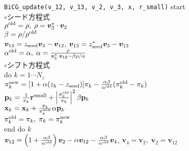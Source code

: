 \documentclass[12pt,titlepage]{jarticle}
\renewenvironment{leftbar}{%
  \def\FrameCommand{\vrule width 1pt \hspace{0pt}}%
  \MakeFramed {\advance\hsize-\width \FrameRestore}}%
 {\endMakeFramed}
\begin{document}
\begin{leftbar}
  \noindent
  \hspace{0.5cm}
  \verb|BiCG_update(v_12, v_13, v_2, v_3, x, r_small)| start
  \\\hspace{1.0cm}
  $\circ$シード方程式
  \\\hspace{1.0cm}
  $\rho^{\rm old} = \rho,\; \rho = {\boldsymbol v}_3^* \cdot {\boldsymbol v}_2$
  \\\hspace{1.0cm}
  $\beta = \rho / \rho^{\rm old}$
  \\\hspace{1.0cm}
  ${\boldsymbol v}_{1 2} = z_{\rm seed} {\boldsymbol v}_2 - {\boldsymbol v}_{1 2}$, 
  ${\boldsymbol v}_{1 3} = z_{\rm seed}^* {\boldsymbol v}_3 - {\boldsymbol v}_{1 3}$
  \\\hspace{1.0cm}
  $\alpha^{\rm old} = \alpha,\; 
  \alpha = \frac{\rho}{{\boldsymbol v}_3^* \cdot {\boldsymbol v}_{1 2} - \beta \rho / \alpha }$
  \\\hspace{1.0cm}
  $\circ$シフト方程式
  \\\hspace{1.0cm}
  do $k = 1 \cdots N_z$
  \\\hspace{1.5cm}
  $\pi_k^{\rm new} = [1+\alpha(z_k-z_{\rm seed})]\pi_k - \frac{\alpha \beta}{\alpha^{\rm old}}(\pi_k^{\rm old} - \pi_k)$
  \\\hspace{1.5cm}
  ${\bf p}_{k} = \frac{1}{\pi_k} {\bf r}^{\rm small} + 
  \left|\frac{\pi^{\rm old}_k}{\pi_k } \right|^2 \beta {\bf p}_{k}$
  \\\hspace{1.5cm}
  ${\bf x}_{k} = {\bf x}_{k} + \frac{\pi_k}{\pi_k^{\rm new}} \alpha {\bf p}_{k}$
  \\\hspace{1.5cm}
  $\pi_k^{\rm old} = \pi_k,\; \pi_k = \pi_k^{\rm new}$
  \\\hspace{1.0cm}
  end do $k$
  \\\hspace{1.0cm}
  ${\boldsymbol v}_{1 2} = \left( 1 + \frac{\alpha \beta}{\alpha^{\rm old}} \right) {\boldsymbol v}_2
  - \alpha {\boldsymbol v}_{1 2} - \frac{\alpha \beta}{\alpha^{\rm old}} {\boldsymbol v}_4$, 
  ${\boldsymbol v}_4 = {\boldsymbol v}_2,\;
  {\boldsymbol v}_2 = {\boldsymbol v}_{1 2}$

\end{leftbar}
\end{document}
